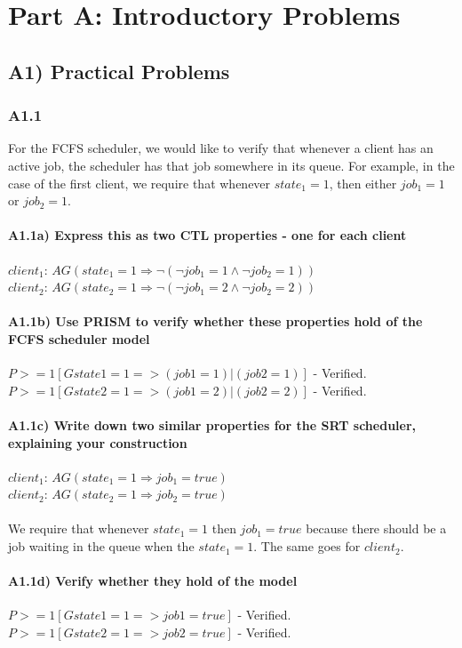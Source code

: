 \documentclass[12pt]{report}
\begin{document}
\chapter*{Part A: Introductory Problems}
\section*{A1) Practical Problems}

\subsection*{A1.1}
For the FCFS scheduler, we would like to verify that whenever a client has an active job, the scheduler has that job somewhere in its queue. For example, in the case of the first client, we require that whenever $state_1 = 1$, then either $job_1 = 1$ or $job_2 = 1$.

\subsubsection*{A1.1a) Express this as two CTL properties - one for each client}
$client_1$: $AG (state_1 = 1 \Rightarrow \neg(\neg job_1 = 1 \wedge \neg job_2 = 1))$\\
$client_2$: $AG (state_2 = 1 \Rightarrow \neg(\neg job_1 = 2 \wedge \neg job_2 = 2))$

\subsubsection*{A1.1b) Use PRISM to verify whether these properties hold of the FCFS scheduler model}
$P>=1 [G state1=1=>(job1=1)|(job2=1)]$ - Verified.\\
$P>=1 [G state2=1=>(job1=2)|(job2=2)]$ - Verified.

\subsubsection*{A1.1c) Write down two similar properties for the SRT scheduler, explaining your construction}
$client_1$: $AG (state_1 = 1 \Rightarrow job_1 = true)$\\
$client_2$: $AG (state_2 = 1 \Rightarrow job_2 = true)$\\
\\
We require that whenever $state_1 = 1$ then $job_1 = true$ because there should be a job waiting in the queue when the $state_1 = 1$. The same goes for $client_2$.

\subsubsection*{A1.1d) Verify whether they hold of the model}
$P>=1 [G state1=1=>job1=true]$ - Verified.\\
$P>=1 [G state2=1=>job2=true]$ - Verified.
\end{document}

